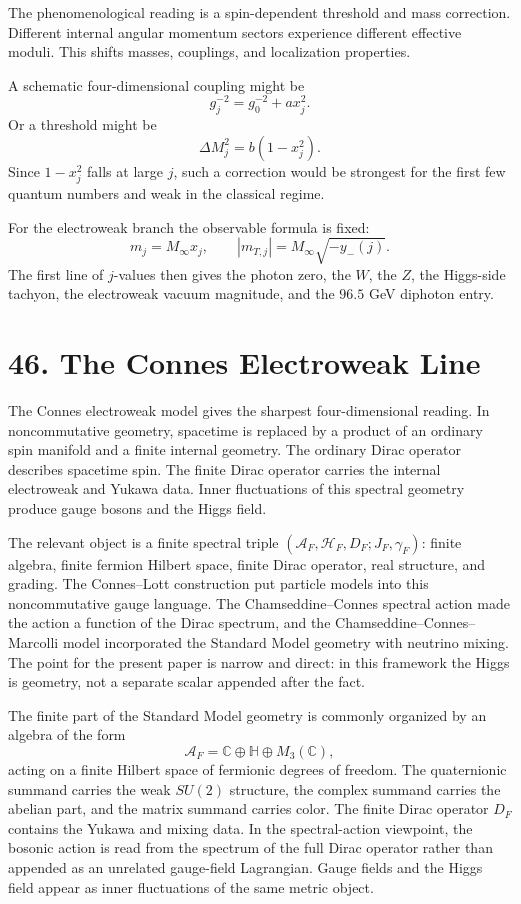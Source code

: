 \documentclass[11pt]{article}
\begin{document}
The phenomenological reading is a spin-dependent threshold and mass correction. Different internal angular momentum sectors experience different effective moduli. This shifts masses, couplings, and localization properties.

A schematic four-dimensional coupling might be
\[
        g_j^{-2}=g_0^{-2}+a x_j^2 .
\]
Or a threshold might be
\[
        \Delta M_j^2=b(1-x_j^2).
\]
Since \(1-x_j^2\) falls at large \(j\), such a correction would be strongest for the first few quantum numbers and weak in the classical regime.

For the electroweak branch the observable formula is fixed:
\[
        m_j=M_\infty x_j,
        \qquad
        |m_{T,j}|=M_\infty\sqrt{-y_-(j)} .
\]
The first line of \(j\)-values then gives the photon zero, the \(W\), the \(Z\), the Higgs-side tachyon, the electroweak vacuum magnitude, and the \(96.5\) GeV diphoton entry.


\section*{46. The Connes Electroweak Line}

The Connes electroweak model gives the sharpest four-dimensional reading. In noncommutative geometry, spacetime is replaced by a product of an ordinary spin manifold and a finite internal geometry. The ordinary Dirac operator describes spacetime spin. The finite Dirac operator carries the internal electroweak and Yukawa data. Inner fluctuations of this spectral geometry produce gauge bosons and the Higgs field.

The relevant object is a finite spectral triple \((\mathcal{A}_F,\mathcal{H}_F,D_F;J_F,\gamma_F)\): finite algebra, finite fermion Hilbert space, finite Dirac operator, real structure, and grading. The Connes--Lott construction put particle models into this noncommutative gauge language. The Chamseddine--Connes spectral action made the action a function of the Dirac spectrum, and the Chamseddine--Connes--Marcolli model incorporated the Standard Model geometry with neutrino mixing. The point for the present paper is narrow and direct: in this framework the Higgs is geometry, not a separate scalar appended after the fact.

The finite part of the Standard Model geometry is commonly organized by an algebra of the form
\[
        \mathcal{A}_F=\mathbb{C}\oplus\mathbb{H}\oplus M_3(\mathbb{C}),
\]
acting on a finite Hilbert space of fermionic degrees of freedom. The quaternionic summand carries the weak \(SU(2)\) structure, the complex summand carries the abelian part, and the matrix summand carries color. The finite Dirac operator \(D_F\) contains the Yukawa and mixing data. In the spectral-action viewpoint, the bosonic action is read from the spectrum of the full Dirac operator rather than appended as an unrelated gauge-field Lagrangian. Gauge fields and the Higgs field appear as inner fluctuations of the same metric object.
\end{document}
